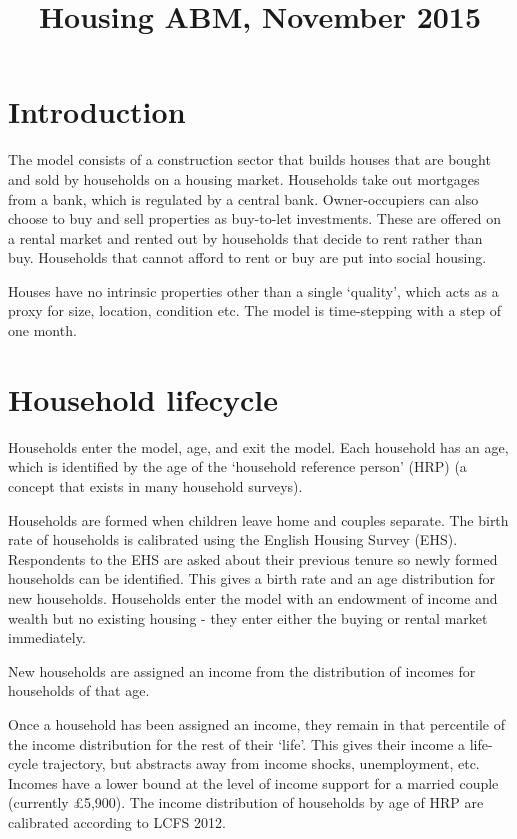 \documentclass{article}
\begin{document}
\title{Housing ABM, November 2015}
\maketitle

\section{Introduction}

The model consists of a construction sector that builds houses that are
bought and sold by households on a housing market. Households take out
mortgages from a bank, which is regulated by a central bank. Owner-occupiers
can also choose to buy and sell properties as buy-to-let investments. These
are offered on a rental market and rented out by households that decide to
rent rather than buy. Households that cannot afford to rent or buy are put
into social housing.

Houses have no intrinsic properties other than a single `quality', which
acts as a proxy for size, location, condition etc. The model is
time-stepping with a step of one month.

\section{Household lifecycle}

Households enter the model, age, and exit the model. Each household has an
age, which is identified by the age of the `household reference person'
(HRP) (a concept that exists in many household surveys).

Households are formed when children leave home and couples separate. The
birth rate of households is calibrated using the English Housing Survey
(EHS). Respondents to the EHS are asked about their previous tenure so newly
formed households can be identified. This gives a birth rate and an age
distribution for new households. Households enter the model with an
endowment of income and wealth but no existing housing - they enter either
the buying or rental market immediately.

New households are assigned an income from the distribution of incomes for
households of that age.

Once a household has been assigned an income, they remain in that percentile
of the income distribution for the rest of their `life'. This gives their
income a life-cycle trajectory, but abstracts away from income shocks,
unemployment, etc. Incomes have a lower bound at the level of income support
for a married couple (currently \pounds 5,900). The income distribution of
households by age of HRP are calibrated according to LCFS 2012.
\end{document}
